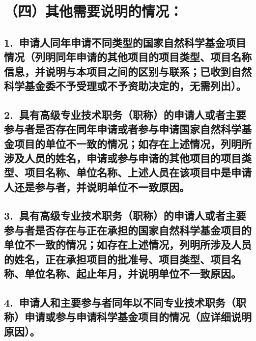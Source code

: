 \documentclass[12pt,UTF8,AutoFakeBold=2.5,a4paper,fontset=none]{ctexart} %
\begin{document}


\clearpage

\section{（四）其他需要说明的情况：}
\subsection{1.~申请人同年申请不同类型的国家自然科学基金项目情况（列明\linebreak{}同年申请的其他项目的项目类型、项目名称信息，并说明与本项目之\linebreak{}间的区别与联系；已收到自然科学基金委不予受理或不予资助决定的，\linebreak{}无需列出）。}


\subsection{2.~具有高级专业技术职务（职称）的申请人或者主要参与者是否\linebreak{}存在同年申请或者参与申请国家自然科学基金项目的单位不一致的情\linebreak{}况；如存在上述情况，列明所涉及人员的姓名，申请或参与申请的其\linebreak{}他项目的项目类型、项目名称、单位名称、上述人员在该项目中是申\linebreak{}请人还是参与者，并说明单位不一致原因。}


\subsection{3.~具有高级专业技术职务（职称）的申请人或者主要参与者是否\linebreak{}存在与正在承担的国家自然科学基金项目的单位不一致的情况；如存\linebreak{}在上述情况，列明所涉及人员的姓名，正在承担项目的批准号、项目\linebreak{}类型、项目名称、单位名称、起止年月，并说明单位不一致原因。}


\subsection{4.~申请人和主要参与者同年以不同专业技术职务（职称）申请或\linebreak{}参与申请科学基金项目的情况（应详细说明原因）。}

\end{document}
